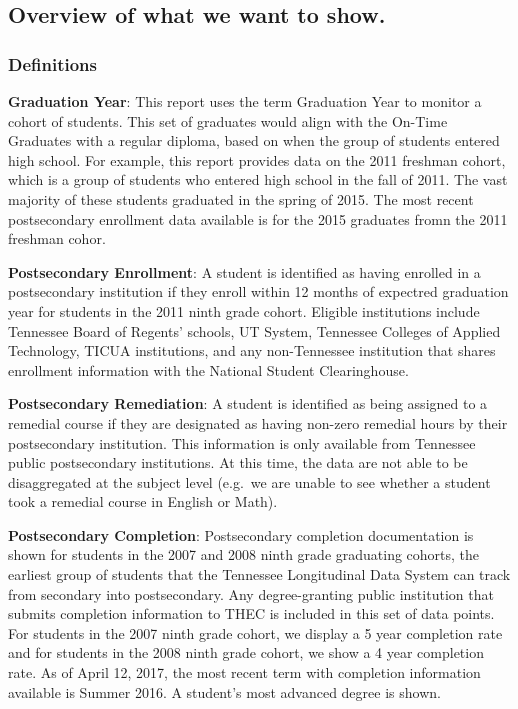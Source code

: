 \documentclass[11pt,]{article}
\begin{document}
\subsection{Overview of what we want to
show.}\label{overview-of-what-we-want-to-show.}

\newpage

\subsubsection{Definitions}\label{definitions}

\textbf{Graduation Year}: This report uses the term Graduation Year to
monitor a cohort of students. This set of graduates would align with the
On-Time Graduates with a regular diploma, based on when the group of
students entered high school. For example, this report provides data on
the 2011 freshman cohort, which is a group of students who entered high
school in the fall of 2011. The vast majority of these students
graduated in the spring of 2015. The most recent postsecondary
enrollment data available is for the 2015 graduates fromn the 2011
freshman cohor.

\textbf{Postsecondary Enrollment}: A student is identified as having
enrolled in a postsecondary institution if they enroll within 12 months
of expectred graduation year for students in the 2011 ninth grade
cohort. Eligible institutions include Tennessee Board of Regents'
schools, UT System, Tennessee Colleges of Applied Technology, TICUA
institutions, and any non-Tennessee institution that shares enrollment
information with the National Student Clearinghouse.

\textbf{Postsecondary Remediation}: A student is identified as being
assigned to a remedial course if they are designated as having non-zero
remedial hours by their postsecondary institution. This information is
only available from Tennessee public postsecondary institutions. At this
time, the data are not able to be disaggregated at the subject level
(e.g.~we are unable to see whether a student took a remedial course in
English or Math).

\textbf{Postsecondary Completion}: Postsecondary completion
documentation is shown for students in the 2007 and 2008 ninth grade
graduating cohorts, the earliest group of students that the Tennessee
Longitudinal Data System can track from secondary into postsecondary.
Any degree-granting public institution that submits completion
information to THEC is included in this set of data points. For students
in the 2007 ninth grade cohort, we display a 5 year completion rate and
for students in the 2008 ninth grade cohort, we show a 4 year completion
rate. As of April 12, 2017, the most recent term with completion
information available is Summer 2016. A student's most advanced degree
is shown.
\end{document}
